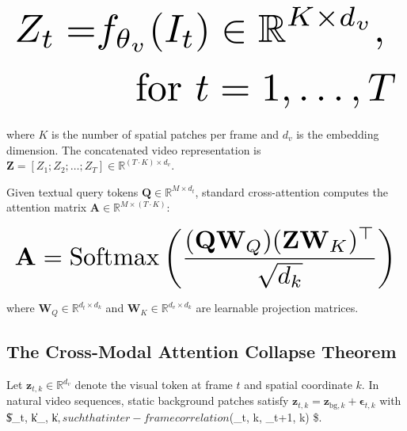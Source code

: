 \documentclass[11pt,a4paper]{article}
\begin{document}
\begin{equation}
\resizebox{\columnwidth}{!}{$\displaystyle
\begin{aligned}
Z_t = & f_{\theta_v}(I_t) \in \mathbb{R}^{K \times d_v}, \\
& \quad \text{for } t = 1, \ldots, T
\end{aligned}
$}
\end{equation}













where $K$ is the number of spatial patches per frame and $d_v$ is the embedding dimension. The concatenated video representation is $\mathbf{Z} = [Z_1; Z_2; \ldots; Z_T] \in \mathbb{R}^{(T \cdot K) \times d_v}$.

Given textual query tokens $\mathbf{Q} \in \mathbb{R}^{M \times d_t}$, standard cross-attention computes the attention matrix $\mathbf{A} \in \mathbb{R}^{M \times (T \cdot K)}$:













\begin{equation}
\resizebox{\columnwidth}{!}{$\displaystyle
\begin{aligned}
\mathbf{A} = \text{Softmax}\left( \frac{(\mathbf{Q} \mathbf{W}_Q) (\mathbf{Z} \mathbf{W}_K)^\top}{\sqrt{d_k}} \right)
\end{aligned}
$}
\end{equation}













where $\mathbf{W}_Q \in \mathbb{R}^{d_t \times d_k}$ and $\mathbf{W}_K \in \mathbb{R}^{d_v \times d_k}$ are learnable projection matrices.




\subsection{The Cross-Modal Attention Collapse Theorem}


Let $\mathbf{z}_{t, k} \in \mathbb{R}^{d_v}$ denote the visual token at frame $t$ and spatial coordinate $k$. In natural video sequences, static background patches satisfy $\mathbf{z}_{t, k} = \mathbf{z}_{\text{bg}, k} + \boldsymbol{\epsilon}_{t, k}$ with \$\|\boldsymbol{\epsilon}\_{t, k}\| \ll \|\_{, k}\|$, such that inter-frame correlation $\rho(\_{t, k}, \_{t+1, k}) \$.
\end{document}
